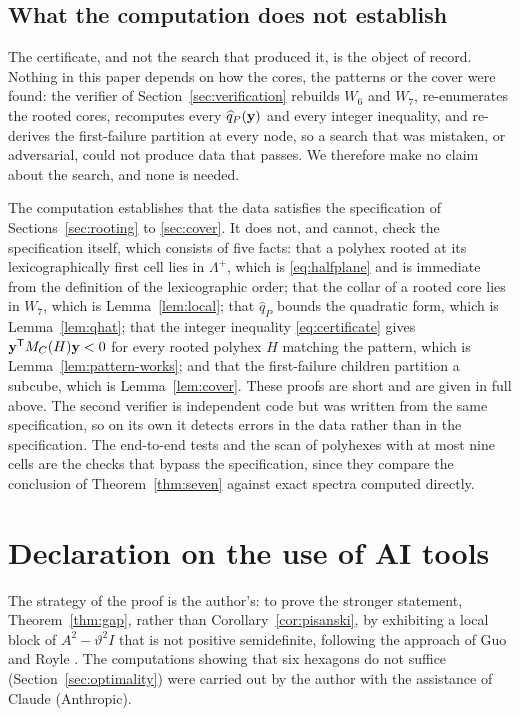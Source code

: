\documentclass[11pt]{article}
\newcommand\thetaG{\vartheta}
\newcommand\tp{^{\mathsf T}}
\theoremstyle{definition}
\begin{document}
\subsection*{What the computation does not establish}

The certificate, and not the search that produced it, is the object of
record.  Nothing in this paper depends on how the cores, the patterns or the
cover were found: the verifier of Section~\ref{sec:verification} rebuilds
$W_6$ and $W_7$, re-enumerates the rooted cores, recomputes every
$\widehat q_P({\mathbf y})$ and every integer inequality, and re-derives the
first-failure partition at every node, so a search that was mistaken, or
adversarial, could not produce data that passes.  We therefore make no claim
about the search, and none is needed.

The computation establishes that the data satisfies the specification of
Sections~\ref{sec:rooting} to \ref{sec:cover}.  It does not, and cannot,
check the specification itself, which consists of five facts: that a polyhex
rooted at its lexicographically first cell lies in $\Lambda^{+}$, which is
\eqref{eq:halfplane} and is immediate from the definition of the
lexicographic order; that the collar of a rooted core lies in $W_7$, which is
Lemma~\ref{lem:local}; that $\widehat q_P$ bounds the quadratic form, which
is Lemma~\ref{lem:qhat}; that the integer inequality
\eqref{eq:certificate} gives $\Zy\tp M_C(H)\Zy<0$ for every rooted polyhex
$H$ matching the pattern, which is Lemma~\ref{lem:pattern-works}; and that
the first-failure children partition a subcube, which is
Lemma~\ref{lem:cover}.  These proofs are short and are given in full above.
The second verifier is independent code but was written from the same
specification, so on its own it detects errors in the data rather than in
the specification.  The end-to-end tests and the scan of polyhexes with at
most nine cells are the checks that bypass the specification, since they
compare the conclusion of Theorem~\ref{thm:seven} against exact spectra
computed directly.


\section*{Declaration on the use of AI tools}

The strategy of the proof is the author's: to prove the stronger statement,
Theorem~\ref{thm:gap}, rather than Corollary~\ref{cor:pisanski}, by
exhibiting a local block of $A^2-\thetaG^2I$ that is not positive
semidefinite, following the approach of Guo and Royle \cite{GuoRoy2024}.
The computations showing that six hexagons do not suffice
(Section~\ref{sec:optimality}) were carried out by the author with the
assistance of Claude (Anthropic).
\end{document}
